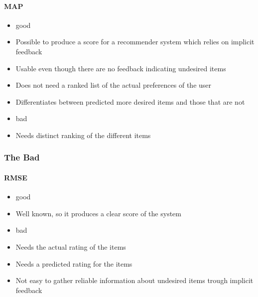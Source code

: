 \paragraph{MAP}
\begin{itemize}
	\item good
	\item Possible to produce a score for a recommender system which relies on implicit feedback
	\item Usable even though there are no feedback indicating undesired items
	\item Does not need a ranked list of the actual preferences of the user
	\item Differentiates between predicted more desired items and those that are not
	\item bad
	\item Needs distinct ranking of the different items
\end{itemize}


\subsubsection{The Bad}
\paragraph{RMSE}
\begin{itemize}
	\item good
	\item Well known, so it produces a clear score of the system
	\item bad
	\item Needs the actual rating of the items
	\item Needs a predicted rating for the items
	\item Not easy to gather reliable information about undesired items trough implicit feedback
\end{itemize}

